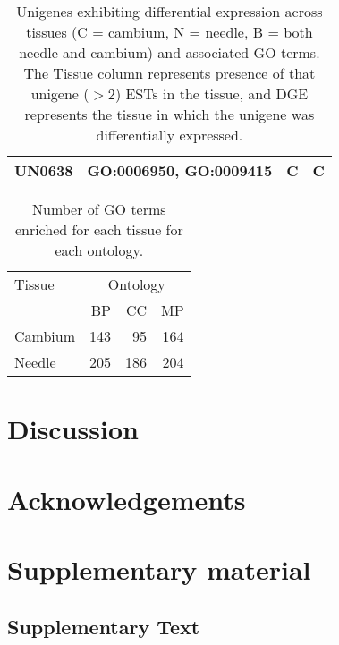 \documentclass[11pt]{article}
\newcommand{\beginsupplement}{%
        \setcounter{table}{0}
        \renewcommand{\thetable}{S\arabic{table}}
        \setcounter{figure}{0}
        \renewcommand{\thefigure}{S\arabic{figure}}
        \renewcommand{\thesection}{S\arabic{section}}
        \renewcommand{\thesubsection}{S\arabic{subsection}} 
     }
\begin{document}
\begin{table}[t]
\begin{tabularx}{\textwidth}{lXcc}
UN0638 & GO:0006950, GO:0009415                                                                                                                                                           & C   & C \\ \bottomrule
\end{tabularx}
\caption{Unigenes exhibiting differential expression across tissues (C = cambium, N = needle, 
B = both needle and cambium) and associated GO terms. The Tissue column represents presence of 
that unigene ($>2$) ESTs in the tissue, and DGE represents the tissue in which the unigene was 
differentially expressed.}
\label{tab:dge_go}
\end{table}


\begin{table}[t]
\centering
\begin{tabular}{lrrr}
\toprule
Tissue  & \multicolumn{3}{c}{Ontology} \\ \cmidrule(l){2-4}
        & BP       & CC      & MP      \\ \midrule
Cambium & 143      & 95      & 164     \\
Needle  & 205      & 186     & 204     \\ \bottomrule
\end{tabular}
\caption{Number of GO terms enriched for each tissue for each ontology.}
\label{tab:dge}
\end{table}


\section*{Discussion}

\section*{Acknowledgements}

\clearpage

\singlespacing



\clearpage

\clearpage

\clearpage

\beginsupplement

\section*{Supplementary material}

\subsection*{Supplementary Text}\label{ss:supp}
\end{document}
